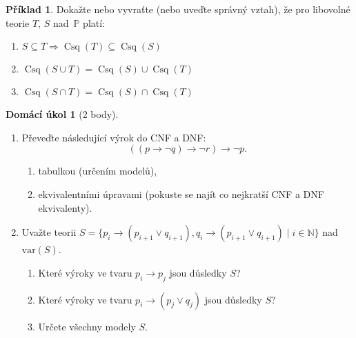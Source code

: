 \documentclass[a4paper]{article}
\theoremstyle{definition}
\newtheorem{problem}{Příklad}
\newtheorem*{ukol}{Domácí úkol}
\DeclareMathOperator{\Conseq}{Csq}
\begin{document}
\medskip\begin{problem}
Dokažte nebo vyvraťte (nebo uveďte správný vztah), že pro libovolné teorie $T$, $S$ nad~$\mathbb{P}$ platí:
\begin{enumerate}
    \item $S\subseteq T \Rightarrow \Conseq(T) \subseteq \Conseq(S)$
    \item $\Conseq(S\cup T)=\Conseq(S) \cup \Conseq(T)$
    \item $\Conseq(S\cap T)=\Conseq(S) \cap \Conseq(T)$
\end{enumerate}
\end{problem}


\medskip\begin{ukol}[2 body]{\,}
\begin{enumerate}[label=\arabic*.]
    \item Převeďte následující výrok do CNF a DNF:
    $$
    ((p\to \neg q) \to \neg r) \to \neg p.
    $$
    \begin{enumerate}
        \item tabulkou (určením modelů),
        \item ekvivalentními úpravami (pokuste se najít co nejkratší CNF a DNF ekvivalenty).
    \end{enumerate}
    \item Uvažte  teorii $S=\{p_i \to (p_{i+1} \vee q_{i+1}), q_i \to (p_{i+1} \vee q_{i+1}) \mid i\in \mathbb{N}\}$ nad $\mathrm{var}(S)$.
    \begin{enumerate}
            \item Které výroky ve tvaru  $p_i \to p_j$ jsou důsledky $S$?
            \item Které výroky ve tvaru  $p_i \to (p_j \vee q_j)$ jsou důsledky $S$?
            \item Určete všechny modely $S$.
    \end{enumerate}
\end{enumerate} 
\end{ukol}
\end{document}
